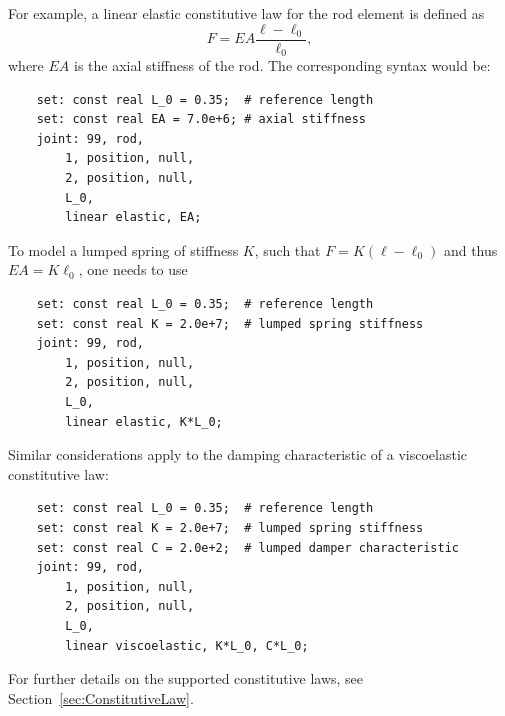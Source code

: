 For example, a linear elastic constitutive law for the rod element
is defined as
\begin{displaymath}
	F = EA \frac{\ell - \ell_0}{\ell_0} ,
\end{displaymath}
where $EA$ is the axial stiffness of the rod.
The corresponding syntax would be:
\begin{verbatim}
    set: const real L_0 = 0.35;  # reference length
    set: const real EA = 7.0e+6; # axial stiffness
    joint: 99, rod,
        1, position, null,
        2, position, null,
        L_0,
        linear elastic, EA;
\end{verbatim}
To model a lumped spring of stiffness $K$, such that $F = K (\ell - \ell_0)$ and thus $EA = K \ell_0$, one needs to use
\begin{verbatim}
    set: const real L_0 = 0.35;  # reference length
    set: const real K = 2.0e+7;  # lumped spring stiffness
    joint: 99, rod,
        1, position, null,
        2, position, null,
        L_0,
        linear elastic, K*L_0;
\end{verbatim}
Similar considerations apply to the damping characteristic of a viscoelastic constitutive law:
\begin{verbatim}
    set: const real L_0 = 0.35;  # reference length
    set: const real K = 2.0e+7;  # lumped spring stiffness
    set: const real C = 2.0e+2;  # lumped damper characteristic
    joint: 99, rod,
        1, position, null,
        2, position, null,
        L_0,
        linear viscoelastic, K*L_0, C*L_0;
\end{verbatim}

For further details on the supported constitutive laws, 
see Section~\ref{sec:ConstitutiveLaw}.



